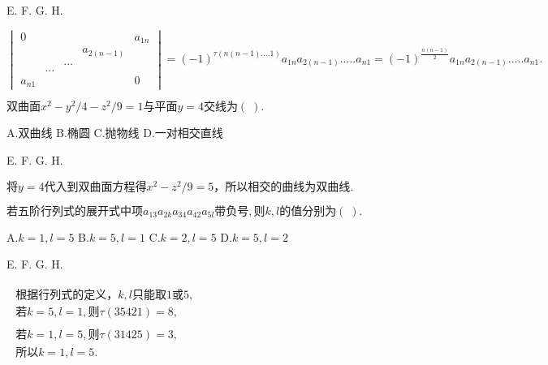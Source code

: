 E.   F.   G.   H.

$\begin{vmatrix}0&&&&a_{1n}\\&&&a_{2(n-1)}&\\&&...&&\\&...&&&\\a_{n1}&&&&0\end{vmatrix}=(-1)^{\tau(n(n-1)....1)}a_{1n}a_{2(n-1)}.....a_{n1}=(-1)^{\textstyle\frac{n(n-1)}2}a_{1n}a_{2(n-1)}.....a_{n1}.$


$\mathrm{双曲面}x^2-y^2/4-z^2/9=1\mathrm{与平面}y=4\mathrm{交线为}(\;).$

A.$\mathrm{双曲线}$   B.$\mathrm{椭圆}$   C.$\mathrm{抛物线}$   D.$\mathrm{一对相交直线}$

E.   F.   G.   H.

$将y=4\mathrm{代入到双曲面方程得}x^2-z^2/9=5，\mathrm{所以相交的曲线为双曲线}.$


$\mathrm{若五阶行列式的展开式中项}a_{13}a_{2k}a_{34}a_{42}a_{5l}\mathrm{带负号},\mathrm 则k,l\mathrm{的值分别为}(\;).$

A.$k=1,l=5$   B.$k=5,l=1$   C.$k=2,l=5$   D.$k=5,l=2$

E.   F.   G.   H.

$\begin{array}{l}\begin{array}{l}\mathrm{根据行列式的定义}，k,l\mathrm{只能取}1或5,\\若k=5,l=1,则\tau(35421)=8,\end{array}\\\begin{array}{l}若k=1,l=5,则\tau(31425)=3,\\\mathrm{所以}k=1,l=5.\\\end{array}\end{array}$


